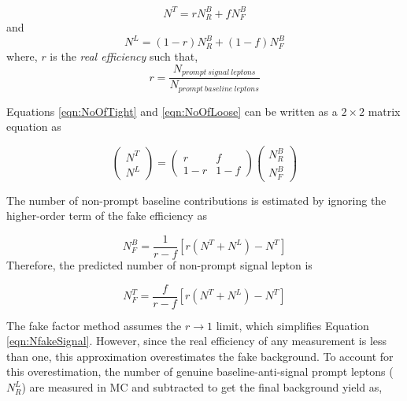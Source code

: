\begin{equation}
N^{T} = rN^{B}_{R}+fN^{B}_{F}
\label{eqn:NoOfTight}
\end{equation}
and 
\begin{equation}
N^{L} = (1-r)N^{B}_{R} + (1-f)N^{B}_{F}
\label{eqn:NoOfLoose}
\end{equation}
where, $r$ is the \textit{real efficiency} such that, 
\begin{equation} 
    r=\frac{N_{prompt~signal~leptons}}{N_{prompt~baseline~leptons}}
\end{equation}

Equations \ref{eqn:NoOfTight} and \ref{eqn:NoOfLoose} can be written as a $2 \times 2$ matrix equation as

\begin{equation}
    \begin{pmatrix} N^{T} \\ N^{L} \end{pmatrix} =  \begin{pmatrix} r & f \\ 1-r & 1-f \end{pmatrix} \begin{pmatrix} N^{B}_{R} \\ N^{B}_{F}\end{pmatrix}
    \label{eqn:RealFakeLepton}
\end{equation}

The number of non-prompt baseline contributions is estimated by ignoring the higher-order term of the fake efficiency as

\begin{equation}
    N_{F}^{B} =  \frac{1}{r-f}[r(N^{T}+N^{L})-N^{T}]
    \label{eqn:NfakeBaseline}
\end{equation}
Therefore, the predicted number of non-prompt signal lepton is 

\begin{equation}
    N_{F}^{T} =  \frac{f}{r-f}[r(N^{T}+N^{L})-N^{T}]
\label{eqn:NfakeSignal}
\end{equation}

The fake factor method assumes the $r\rightarrow 1$ limit, which simplifies Equation \ref{eqn:NfakeSignal}. However, since the real efficiency of any measurement is less than one, this approximation overestimates the fake background. To account for this overestimation, the number of genuine baseline-anti-signal prompt leptons ($N^{L}_{R}$) are measured in MC and subtracted to get the final background yield as, 

